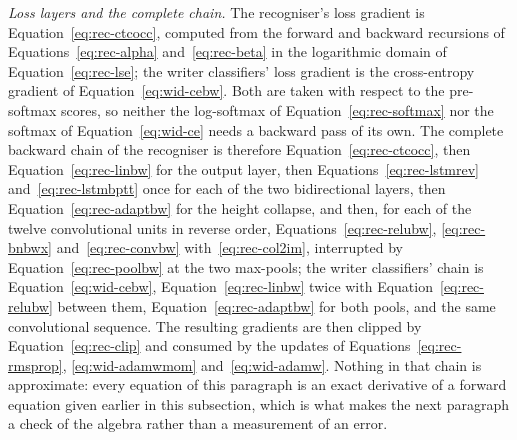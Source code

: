 \emph{Loss layers and the complete chain.} The recogniser's loss gradient is Equation~\ref{eq:rec-ctcocc}, computed from the forward and backward recursions of Equations~\ref{eq:rec-alpha} and~\ref{eq:rec-beta} in the logarithmic domain of Equation~\ref{eq:rec-lse}; the writer classifiers' loss gradient is the cross-entropy gradient of Equation~\ref{eq:wid-cebw}.
Both are taken with respect to the pre-softmax scores, so neither the log-softmax of Equation~\ref{eq:rec-softmax} nor the softmax of Equation~\ref{eq:wid-ce} needs a backward pass of its own.
The complete backward chain of the recogniser is therefore Equation~\ref{eq:rec-ctcocc}, then Equation~\ref{eq:rec-linbw} for the output layer, then Equations~\ref{eq:rec-lstmrev} and~\ref{eq:rec-lstmbptt} once for each of the two bidirectional layers, then Equation~\ref{eq:rec-adaptbw} for the height collapse, and then, for each of the twelve convolutional units in reverse order, Equations~\ref{eq:rec-relubw}, \ref{eq:rec-bnbwx} and~\ref{eq:rec-convbw} with~\ref{eq:rec-col2im}, interrupted by Equation~\ref{eq:rec-poolbw} at the two max-pools; the writer classifiers' chain is Equation~\ref{eq:wid-cebw}, Equation~\ref{eq:rec-linbw} twice with Equation~\ref{eq:rec-relubw} between them, Equation~\ref{eq:rec-adaptbw} for both pools, and the same convolutional sequence.
The resulting gradients are then clipped by Equation~\ref{eq:rec-clip} and consumed by the updates of Equations~\ref{eq:rec-rmsprop}, \ref{eq:wid-adamwmom} and~\ref{eq:wid-adamw}.
Nothing in that chain is approximate: every equation of this paragraph is an exact derivative of a forward equation given earlier in this subsection, which is what makes the next paragraph a check of the algebra rather than a measurement of an error.

